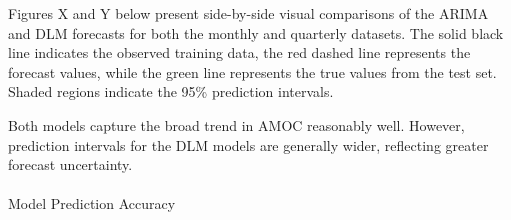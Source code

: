 \documentclass[
  11pt,
]{article}
\makeatletter
\let\oldparagraph\paragraph
\renewcommand{\paragraph}{
    \@ifstar
      \xxxParagraphStar
      \xxxParagraphNoStar
  }
\newcommand{\xxxParagraphStar}[1]{\oldparagraph*{#1}\mbox{}}
\newcommand{\xxxParagraphNoStar}[1]{\oldparagraph{#1}\mbox{}}
\makeatother
\begin{document}
Figures X and Y below present side-by-side visual comparisons of the
ARIMA and DLM forecasts for both the monthly and quarterly datasets. The
solid black line indicates the observed training data, the red dashed
line represents the forecast values, while the green line represents the
true values from the test set. Shaded regions indicate the 95\%
prediction intervals.

Both models capture the broad trend in AMOC reasonably well. However,
prediction intervals for the DLM models are generally wider, reflecting
greater forecast uncertainty.

\paragraph{Model Prediction Accuracy}\label{model-prediction-accuracy}
\end{document}
